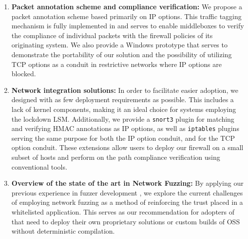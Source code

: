 \begin{enumerate}
    \item \textbf{Packet annotation scheme and compliance verification:}
    We propose a packet annotation scheme based primarily on IP options. This
    traffic tagging mechanism is fully implemented in \daf{} and serves to
    enable middleboxes to verify the compliance of individual packets with the
    firewall policies of its originating system. We also provide a Windows
    prototype \cite{gherghita2024label} that serves to demonstrate the
    portability of our solution and the possibility of utilizing TCP options as
    a conduit in restrictive networks where IP options are blocked.

    \item \textbf{Network integration solutions:} In order to facilitate easier
    adoption, we designed \daf{} with as few deployment requirements as
    possible. This includes a lack of kernel components, making it an ideal
    choice for systems employing the lockdown LSM. Additionally, we provide
    a \texttt{snort3} plugin for matching and verifying HMAC annotations as
    IP options, as well as \texttt{iptables} plugins serving the same purpose
    for both the IP option conduit, and for the TCP option conduit. These
    extensions allow users to deploy our firewall on a small subset of hosts and
    perform on the path compliance verification using conventional tools.

    \item \textbf{Overview of the state of the art in Network Fuzzing:}
    By applying our previous experience in fuzzer development \cite{nikolic2021refined},
    we explore the current challenges of employing network fuzzing
    \cite{mantu2023network} as a method of reinforcing the trust placed in a
    whitelisted application. This serves as our recommendation for adopters of
    \daf{} that need to deploy their own proprietary solutions or custom builds
    of OSS without deterministic compilation.
\end{enumerate}
